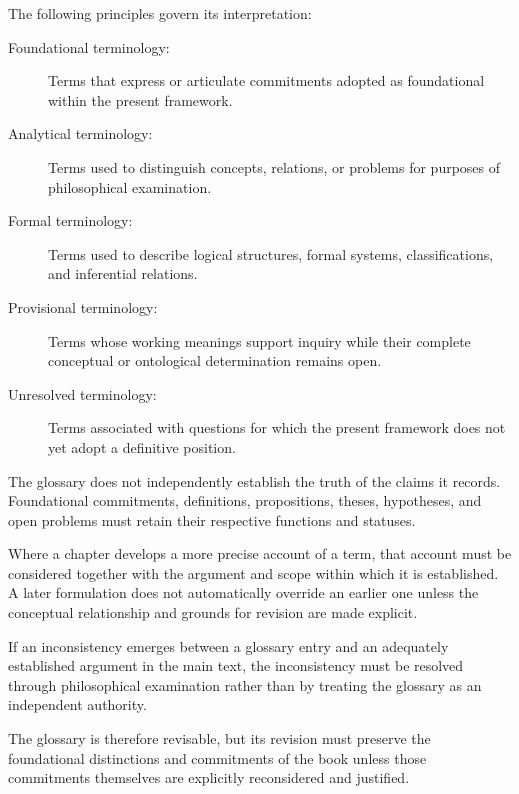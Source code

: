 The following principles govern its interpretation:

\begin{description}

    \item[Foundational terminology:]
    Terms that express or articulate commitments adopted as
    foundational within the present framework.

    \item[Analytical terminology:]
    Terms used to distinguish concepts, relations, or problems
    for purposes of philosophical examination.

    \item[Formal terminology:]
    Terms used to describe logical structures, formal systems,
    classifications, and inferential relations.

    \item[Provisional terminology:]
    Terms whose working meanings support inquiry while their
    complete conceptual or ontological determination remains open.

    \item[Unresolved terminology:]
    Terms associated with questions for which the present
    framework does not yet adopt a definitive position.

\end{description}


The glossary does not independently establish the truth of the
claims it records. Foundational commitments, definitions,
propositions, theses, hypotheses, and open problems must retain
their respective functions and statuses.

Where a chapter develops a more precise account of a term, that
account must be considered together with the argument and scope
within which it is established. A later formulation does not
automatically override an earlier one unless the conceptual
relationship and grounds for revision are made explicit.

If an inconsistency emerges between a glossary entry and an
adequately established argument in the main text, the inconsistency
must be resolved through philosophical examination rather than
by treating the glossary as an independent authority.

The glossary is therefore revisable, but its revision must preserve
the foundational distinctions and commitments of the book unless
those commitments themselves are explicitly reconsidered and
justified.


